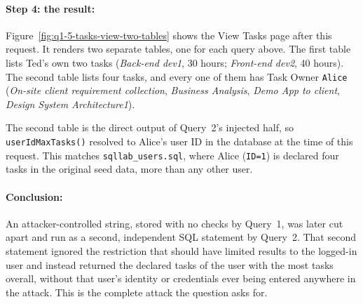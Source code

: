 \paragraph{Step 4: the result:} Figure~\ref{fig:q1-5-tasks-view-two-tables}
shows the View Tasks page after this request. It renders two separate
tables, one for each query above. The first table lists Ted's own two tasks
(\textit{Back-end dev1}, 30 hours; \textit{Front-end dev2}, 40 hours). The
second table lists four tasks, and every one of them has Task Owner
\texttt{Alice} (\textit{On-site client requirement collection},
\textit{Business Analysis}, \textit{Demo App to client}, \textit{Design
System Architecture1}).


The second table is the direct output of Query~2's injected half, so
\texttt{userIdMaxTasks()} resolved to Alice's user ID in the database at the
time of this request. This matches \texttt{sqllab\_users.sql}, where Alice
(\texttt{ID=1}) is declared four tasks in the original seed data, more than
any other user.

\paragraph{Conclusion:} An attacker-controlled string, stored with no
checks by Query~1, was later cut apart and run as a second, independent SQL
statement by Query~2. That second statement ignored the restriction that
should have limited results to the logged-in user and instead returned the
declared tasks of the user with the most tasks overall, without that user's
identity or credentials ever being entered anywhere in the attack. This is
the complete attack the question asks for.
